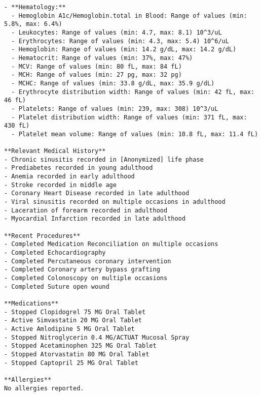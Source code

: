 \begin{lstlisting}
- **Hematology:**
  - Hemoglobin A1c/Hemoglobin.total in Blood: Range of values (min: 5.8%, max: 6.4%)
  - Leukocytes: Range of values (min: 4.7, max: 8.1) 10^3/uL
  - Erythrocytes: Range of values (min: 4.3, max: 5.4) 10^6/uL
  - Hemoglobin: Range of values (min: 14.2 g/dL, max: 14.2 g/dL)
  - Hematocrit: Range of values (min: 37%, max: 47%)
  - MCV: Range of values (min: 80 fL, max: 84 fL)
  - MCH: Range of values (min: 27 pg, max: 32 pg)
  - MCHC: Range of values (min: 33.8 g/dL, max: 35.9 g/dL)
  - Erythrocyte distribution width: Range of values (min: 42 fL, max: 46 fL)
  - Platelets: Range of values (min: 239, max: 308) 10^3/uL
  - Platelet distribution width: Range of values (min: 371 fL, max: 430 fL)
  - Platelet mean volume: Range of values (min: 10.8 fL, max: 11.4 fL)

**Relevant Medical History**
- Chronic sinusitis recorded in [Anonymized] life phase
- Prediabetes recorded in young adulthood
- Anemia recorded in early adulthood
- Stroke recorded in middle age
- Coronary Heart Disease recorded in late adulthood
- Viral sinusitis recorded on multiple occasions in adulthood
- Laceration of forearm recorded in adulthood
- Myocardial Infarction recorded in late adulthood

**Recent Procedures**
- Completed Medication Reconciliation on multiple occasions
- Completed Echocardiography
- Completed Percutaneous coronary intervention
- Completed Coronary artery bypass grafting
- Completed Colonoscopy on multiple occasions
- Completed Suture open wound

**Medications**
- Stopped Clopidogrel 75 MG Oral Tablet
- Active Simvastatin 20 MG Oral Tablet
- Active Amlodipine 5 MG Oral Tablet
- Stopped Nitroglycerin 0.4 MG/ACTUAT Mucosal Spray
- Stopped Acetaminophen 325 MG Oral Tablet
- Stopped Atorvastatin 80 MG Oral Tablet
- Stopped Captopril 25 MG Oral Tablet

**Allergies**
No allergies reported.

\end{lstlisting}

\break

